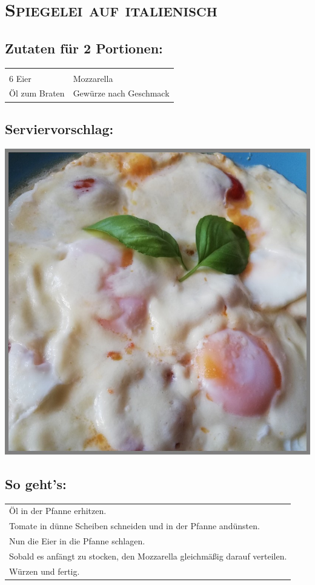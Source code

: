 \section{\textsc{Spiegelei auf italienisch}}

\subsection*{Zutaten für 2 Portionen:}

\begin{tabular}{p{7.5cm} p{7.5cm}}
	& \\
	6 Eier & Mozzarella \\
	Öl zum Braten & Gewürze nach Geschmack
\end{tabular}

\subsection*{Serviervorschlag:}

\includegraphics[width=\textwidth]{img/spiegelei_ita.jpg} \cite{itaspiegelei}

\subsection*{So geht's:}

\begin{tabular}{p{15cm}}
	\\
  Öl in der Pfanne erhitzen.\\
  Tomate in dünne Scheiben schneiden und in der Pfanne andünsten.\\
  Nun die Eier in die Pfanne schlagen.\\
  Sobald es anfängt zu stocken, den Mozzarella gleichmäßig darauf verteilen.\\
  Würzen und fertig.
\end{tabular}
